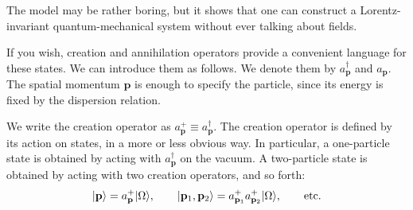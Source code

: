 The model may be rather boring, but it shows that one can construct a
Lorentz-invariant quantum-mechanical system without ever talking about fields.

If you wish, creation and annihilation operators provide a convenient language
for these states. We can
introduce them as follows.
We denote them by $a^\dagger_{\mathbf p}$ and $a_{\mathbf p}$. The spatial
momentum $\mathbf p$ is enough to specify the particle, since its energy is
fixed by the dispersion relation.

We write the creation operator as $a_{\mathbf p}^{+}\equiv
a_{\mathbf p}^{\dagger}$.
The creation operator is defined by its action on states, in a more or less
obvious way. In particular, a one-particle state is obtained by acting with
$a^\dagger_{\mathbf p}$ on the vacuum.
A two-particle state is obtained by acting with two creation operators, and so
forth:
\begin{equation}
  \lvert \mathbf p\rangle=a_{\mathbf p}^{+}\lvert \Omega\rangle,
  \qquad
  \lvert \mathbf p_1,\mathbf p_2\rangle
  =a_{\mathbf p_1}^{+}a_{\mathbf p_2}^{+}\lvert \Omega\rangle,
  \qquad \text{etc.}
  \label{eq:253a-created-states}
\end{equation}

